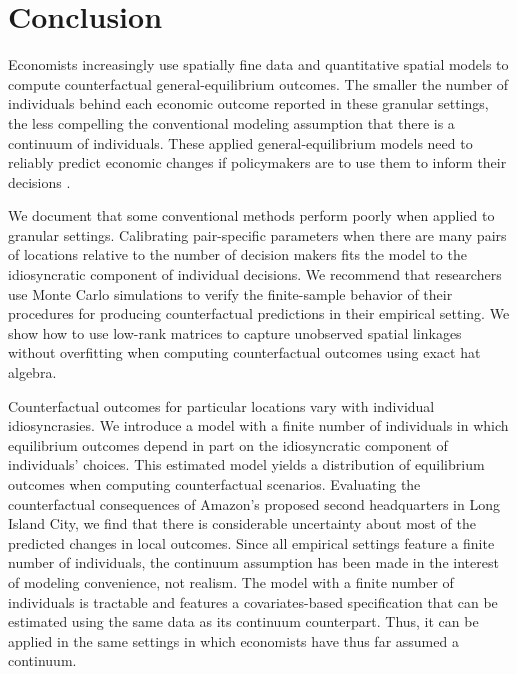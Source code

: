 \documentclass[11pt]{article}
\theoremstyle{definition}
\begin{document}
\FloatBarrier
\section{Conclusion}\label{sec:conclusion}

Economists increasingly use spatially fine data and quantitative spatial models to compute counterfactual general-equilibrium outcomes.
The smaller the number of individuals behind each economic outcome reported in these granular settings,
the less compelling the conventional modeling assumption that there is a continuum of individuals.
These applied general-equilibrium models need to reliably predict economic changes
if policymakers are to use them to inform their decisions
\citep{Kehoe:2005,BryanGlaeserTsivanidis:2020,AdaoArkolakisEsposito:2020}.

We document that some conventional methods perform poorly when applied to granular settings.
Calibrating pair-specific parameters when there are many pairs of locations relative to the number of decision makers
fits the model to the idiosyncratic component of individual decisions.
We recommend that researchers use Monte Carlo simulations to verify the finite-sample behavior of their procedures for producing counterfactual predictions in their empirical setting.
We show how to use low-rank matrices to capture unobserved spatial linkages without overfitting
when computing counterfactual outcomes using exact hat algebra.

Counterfactual outcomes for particular locations vary with individual idiosyncrasies.
We introduce a model with a finite number of individuals in which
equilibrium outcomes depend in part on the idiosyncratic component of individuals' choices.
This estimated model yields a distribution of equilibrium outcomes when computing counterfactual scenarios.
Evaluating the counterfactual consequences of Amazon's proposed second headquarters in Long Island City,
we find that there is considerable uncertainty about most of the predicted changes in local outcomes.
Since all empirical settings feature a finite number of individuals,
the continuum assumption has been made in the interest of modeling convenience,
not realism.
The model with a finite number of individuals is tractable
and
features a covariates-based specification that can be estimated
using the same data as its continuum counterpart.
Thus, it can be applied in the same settings in which economists have thus far assumed a continuum.
\clearpage

 
\end{document}
